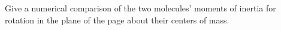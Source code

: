 Give a numerical comparison of the two molecules' moments
of inertia for rotation in the plane of the page about their
centers of mass.
